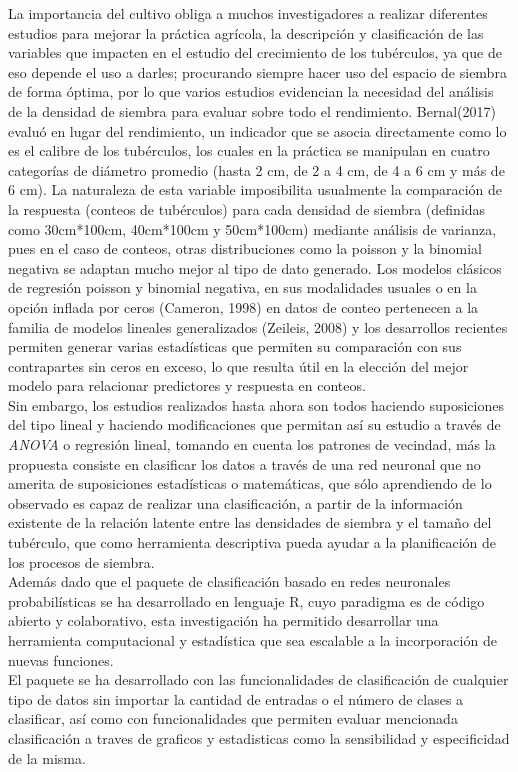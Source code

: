  La importancia del cultivo obliga a muchos investigadores a realizar diferentes estudios para mejorar la práctica agrícola, la descripción y clasificación de las variables que impacten en el estudio del crecimiento de los tubérculos, ya que de eso depende el uso a darles; procurando siempre hacer uso del espacio de siembra de forma óptima, por lo que varios estudios evidencian la necesidad del an\'alisis de la densidad de siembra para evaluar sobre todo el rendimiento. Bernal(2017) evaluó en lugar del rendimiento, un indicador que se asocia directamente como lo es el calibre de los tubérculos, los cuales en la práctica se manipulan en cuatro categorías de diámetro promedio (hasta 2 cm, de 2 a 4 cm, de 4 a 6 cm y más de 6 cm). La naturaleza de esta variable imposibilita usualmente la comparación de la respuesta (conteos de tubérculos) para cada densidad de siembra (definidas como 30cm*100cm, 40cm*100cm y 50cm*100cm) mediante análisis de varianza, pues en el caso de conteos, otras distribuciones como la poisson y la binomial negativa se adaptan mucho mejor al tipo de dato generado. Los modelos clásicos de regresión poisson y binomial negativa, en sus modalidades usuales o en la opción inflada por ceros (Cameron, 1998) en datos de conteo pertenecen a la familia de modelos lineales generalizados (Zeileis, 2008) y los desarrollos recientes permiten generar varias estadísticas que permiten su comparación con sus contrapartes sin ceros en exceso, lo que resulta útil en la elección del mejor modelo para relacionar predictores y respuesta en conteos.\\

Sin embargo, los estudios realizados hasta ahora son todos haciendo suposiciones del tipo lineal y haciendo modificaciones que permitan así su estudio a través de \textit{ANOVA} o regresión lineal, tomando en cuenta los patrones de vecindad, más la propuesta consiste en clasificar los datos a través de una red neuronal que no amerita de suposiciones estadísticas o matemáticas, que sólo aprendiendo de lo observado es capaz de realizar una clasificación, a partir de la información existente de la relación latente entre las densidades de siembra y el tamaño del tubérculo, que como herramienta descriptiva pueda ayudar a la planificación de los procesos de siembra.\\

Además dado que el paquete de clasificación basado en redes neuronales probabilísticas se ha desarrollado en lenguaje R, cuyo paradigma es de código abierto y colaborativo, esta investigación ha permitido desarrollar una herramienta computacional y estadística que sea escalable a la incorporación de nuevas funciones.\\

El paquete se ha desarrollado con las funcionalidades de clasificación de cualquier tipo de datos sin importar la cantidad de entradas o el número de clases a clasificar, así como con funcionalidades que permiten evaluar mencionada clasificación a traves de graficos y estadisticas como la sensibilidad y especificidad de la misma.\\


